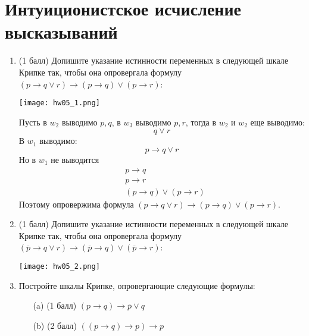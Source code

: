 \section{Интуиционистское исчисление высказываний}
\begin{enumerate}
    \item (1 балл) Допишите указание истинности переменных в следующей шкале Крипке так,
    чтобы она опровергала формулу $(p \rightarrow q \lor r) \rightarrow (p \rightarrow q) \lor (p \rightarrow r)$:
    \begin{center}
        \texttt{[image: hw05\_1.png]}
    \end{center}
    \begin{solution}
        Пусть в $w_2$ выводимо $p, q$, в $w_3$ выводимо $p, r$, тогда в $w_2$ и $w_2$ еще выводимо:
        \begin{equation}
            q \lor r
        \end{equation}
        В $w_1$ выводимо:
        \begin{equation}
            p \rightarrow q \lor r
        \end{equation}
        Но в $w_1$ не выводится
        \begin{align*}
            &p \rightarrow q \\
            &p \rightarrow r \\
            &(p \rightarrow q) \lor (p \rightarrow r)
        \end{align*}
        Поэтому опровержима формула $(p \rightarrow q \lor r) \rightarrow (p \rightarrow q) \lor (p \rightarrow r)$.
    \end{solution}
    \item (1 балл) Допишите указание истинности переменных в следующей шкале Крипке так,
    чтобы она опровергала формулу $(\overline{p} \rightarrow q \lor r) \rightarrow (\overline{p} \rightarrow q) \lor (\overline{p} \rightarrow r)$:
    \begin{center}
        \texttt{[image: hw05\_2.png]}
    \end{center}
    \item Постройте шкалы Крипке, опровергающие следующие формулы:
    \begin{itemize}
        \item[(a)] (1 балл) $(p \rightarrow q) \rightarrow \overline{p} \lor q$
        \item[(b)] (2 балл) $((p \rightarrow q) \rightarrow p) \rightarrow p$
    \end{itemize}
\end{enumerate}
\clearpage
